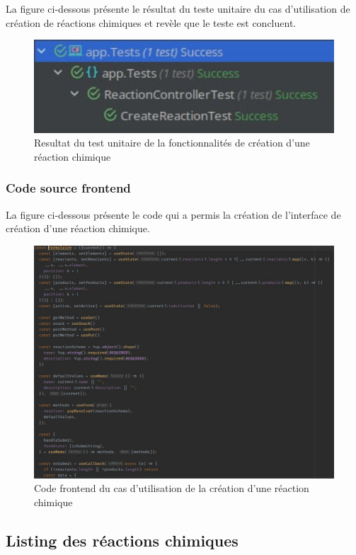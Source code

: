 La figure ci-dessous présente le résultat du teste unitaire du cas d'utilisation de création de réactions chimiques et revèle que le teste est concluent.

\begin{figure}[H]
	\centering
	\includegraphics[width=1\textwidth]{img/utcre}
	\caption{Resultat du test unitaire de la fonctionnalités de création d'une réaction chimique}
\end{figure}

\subsubsection{Code source frontend}

La figure ci-dessous présente le code qui a permis la création de l'interface de création d'une réaction chimique.

\begin{figure}[H]
	\centering
	\includegraphics[width=1\textwidth]{img/frec}
	\caption{Code frontend du cas d'utilisation de la création d'une réaction chimique}
\end{figure}

\subsection{Listing des réactions chimiques}

